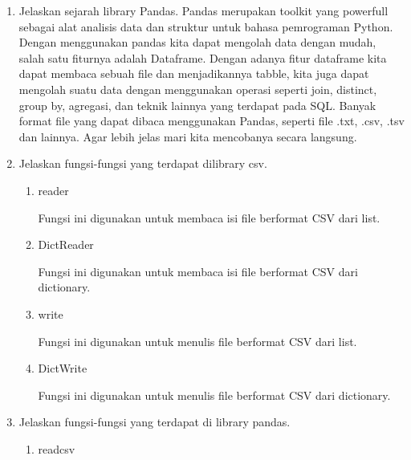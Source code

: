 \begin{enumerate}
\begin{enumerate}
   \item Jelaskan sejarah library Pandas.
   Pandas merupakan toolkit yang powerfull sebagai alat analisis data dan struktur untuk bahasa pemrograman Python. Dengan menggunakan pandas kita dapat mengolah data dengan mudah, salah satu fiturnya adalah Dataframe. Dengan adanya fitur dataframe kita dapat membaca sebuah file dan menjadikannya tabble, kita juga dapat mengolah suatu data dengan menggunakan operasi seperti join, distinct, group by, agregasi, dan teknik lainnya yang terdapat pada SQL. Banyak format file yang dapat dibaca menggunakan Pandas, seperti file .txt, .csv, .tsv dan lainnya. Agar lebih jelas mari kita mencobanya secara langsung.

   \item Jelaskan fungsi-fungsi yang terdapat dilibrary csv.
       \begin{enumerate}
		\item reader
		
		Fungsi ini digunakan untuk membaca isi file berformat CSV dari list.
		
		
		
		\item DictReader
		
		Fungsi ini digunakan untuk membaca isi file berformat CSV dari dictionary.
		
		
		
		\item write
		
		Fungsi ini digunakan untuk menulis file berformat CSV dari list.
		
		
		
		\item DictWrite
		
		Fungsi ini digunakan untuk menulis file berformat CSV dari dictionary.
		
		
		
	\end{enumerate}
   \item Jelaskan fungsi-fungsi yang terdapat di library pandas.
       \begin{enumerate}
		\item readcsv
		

\end{enumerate}
\end{enumerate}
\end{enumerate}
